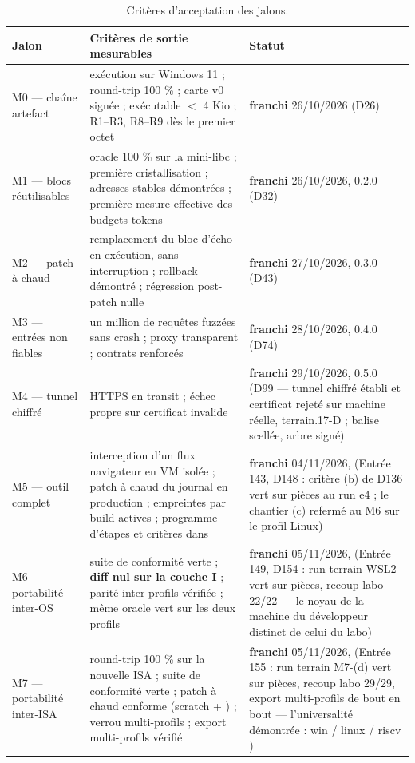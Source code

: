 \begin{table}[htbp]
\centering\small
\caption{Critères d'acceptation des jalons.}
\label{tab:jalons}
\begin{tabularx}{\textwidth}{@{}l Y >{\raggedright\arraybackslash}p{2.6cm}@{}}
\toprule
\textbf{Jalon} & \textbf{Critères de sortie mesurables} & \textbf{Statut} \\
\midrule
M0 — chaîne artefact & exécution sur Windows 11 ; round-trip 100 \% ; carte v0 signée ;
exécutable $<$ 4 Kio ; R1–R3, R8–R9 dès le premier octet & \textbf{franchi} 26/10/2026 (D26) \\
M1 — blocs réutilisables & oracle 100 \% sur la mini-libc ; première cristallisation ;
adresses stables démontrées ; première mesure effective des budgets tokens & \textbf{franchi} 26/10/2026, 0.2.0 (D32) \\
M2 — patch à chaud & remplacement du bloc d'écho en exécution, sans interruption ;
rollback démontré ; régression post-patch nulle & \textbf{franchi} 27/10/2026, 0.3.0 (D43) \\
M3 — entrées non fiables & un million de requêtes fuzzées sans crash ; proxy
transparent ; contrats renforcés & \textbf{franchi} 28/10/2026, 0.4.0 (D74) \\
M4 — tunnel chiffré & HTTPS en transit ; échec propre sur certificat invalide & \textbf{franchi} 29/10/2026, 0.5.0 (D99 — tunnel chiffré établi et certificat rejeté sur machine réelle, terrain.17-D ; balise scellée, arbre  signé) \\
M5 — outil complet & interception d'un flux navigateur en VM isolée ; patch à chaud du
journal en production ; empreintes par build actives ; programme d'étapes et critères
dans  & \textbf{franchi} 04/11/2026,  (Entrée 143, D148 : critère (b) de D136 vert sur pièces au run e4 ; le chantier (c) refermé au M6 sur le profil Linux) \\
M6 — portabilité inter-OS & suite de conformité verte ; \textbf{diff nul sur la couche
I} ; parité inter-profils vérifiée ; même oracle vert sur les deux profils & \textbf{franchi} 05/11/2026,  (Entrée 149, D154 : run terrain WSL2 vert sur pièces, recoup labo 22/22 — le noyau de la machine du développeur distinct de celui du labo) \\
M7 — portabilité inter-ISA & round-trip 100 \% sur la nouvelle ISA ; suite de conformité
verte ; patch à chaud conforme (scratch + ) ; verrou multi-profils ; export
multi-profils vérifié & \textbf{franchi} 05/11/2026,  (Entrée 155 : run terrain M7-(d) vert sur pièces, recoup labo 29/29, export multi-profils de bout en bout — l'universalité démontrée : win  / linux  / riscv ) \\

\end{tabularx}
\end{table}
